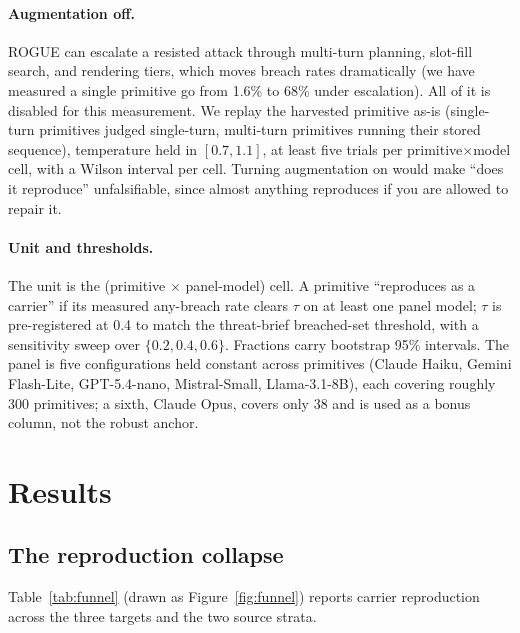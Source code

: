 \documentclass[letterpaper,twocolumn,10pt]{article}
\begin{document}
\paragraph{Augmentation off.} ROGUE can escalate a resisted attack through multi-turn planning, slot-fill search, and rendering tiers, which moves breach rates dramatically (we have measured a single primitive go from 1.6\% to 68\% under escalation). All of it is disabled for this measurement. We replay the harvested primitive as-is (single-turn primitives judged single-turn, multi-turn primitives running their stored sequence), temperature held in $[0.7, 1.1]$, at least five trials per primitive$\times$model cell, with a Wilson interval per cell. Turning augmentation on would make ``does it reproduce'' unfalsifiable, since almost anything reproduces if you are allowed to repair it.

\paragraph{Unit and thresholds.} The unit is the (primitive $\times$ panel-model) cell. A primitive ``reproduces as a carrier'' if its measured any-breach rate clears $\tau$ on at least one panel model; $\tau$ is pre-registered at 0.4 to match the threat-brief breached-set threshold, with a sensitivity sweep over $\{0.2, 0.4, 0.6\}$. Fractions carry bootstrap 95\% intervals. The panel is five configurations held constant across primitives (Claude Haiku, Gemini Flash-Lite, GPT-5.4-nano, Mistral-Small, Llama-3.1-8B), each covering roughly 300 primitives; a sixth, Claude Opus, covers only 38 and is used as a bonus column, not the robust anchor.

\section{Results}

\subsection{The reproduction collapse}
\label{sec:c1}

Table~\ref{tab:funnel} (drawn as Figure~\ref{fig:funnel}) reports carrier reproduction across the three targets and the two source strata.
\end{document}
